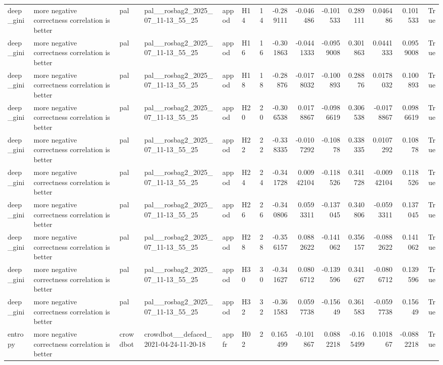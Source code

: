 \begin{longtable}{llllllrrrrrrrr}
deep\_gini & more negative correctness correlation is better & pal & pal\_\_rosbag2\_2025\_07\_11-13\_55\_25 & appod & H14 & 14 & -0.289111 & -0.046486 & -0.101533 & 0.289111 & 0.046486 & 0.101533 & True \\
deep\_gini & more negative correctness correlation is better & pal & pal\_\_rosbag2\_2025\_07\_11-13\_55\_25 & appod & H16 & 16 & -0.301863 & -0.0441333 & -0.0959008 & 0.301863 & 0.0441333 & 0.0959008 & True \\
deep\_gini & more negative correctness correlation is better & pal & pal\_\_rosbag2\_2025\_07\_11-13\_55\_25 & appod & H18 & 18 & -0.28876 & -0.0178032 & -0.100893 & 0.28876 & 0.0178032 & 0.100893 & True \\
deep\_gini & more negative correctness correlation is better & pal & pal\_\_rosbag2\_2025\_07\_11-13\_55\_25 & appod & H20 & 20 & -0.306538 & 0.0178867 & -0.0986619 & 0.306538 & -0.0178867 & 0.0986619 & True \\
deep\_gini & more negative correctness correlation is better & pal & pal\_\_rosbag2\_2025\_07\_11-13\_55\_25 & appod & H22 & 22 & -0.338335 & -0.0107292 & -0.10878 & 0.338335 & 0.0107292 & 0.10878 & True \\
deep\_gini & more negative correctness correlation is better & pal & pal\_\_rosbag2\_2025\_07\_11-13\_55\_25 & appod & H24 & 24 & -0.341728 & 0.00942104 & -0.118526 & 0.341728 & -0.00942104 & 0.118526 & True \\
deep\_gini & more negative correctness correlation is better & pal & pal\_\_rosbag2\_2025\_07\_11-13\_55\_25 & appod & H26 & 26 & -0.340806 & 0.0593311 & -0.137045 & 0.340806 & -0.0593311 & 0.137045 & True \\
deep\_gini & more negative correctness correlation is better & pal & pal\_\_rosbag2\_2025\_07\_11-13\_55\_25 & appod & H28 & 28 & -0.356157 & 0.0882622 & -0.141062 & 0.356157 & -0.0882622 & 0.141062 & True \\
deep\_gini & more negative correctness correlation is better & pal & pal\_\_rosbag2\_2025\_07\_11-13\_55\_25 & appod & H30 & 30 & -0.341627 & 0.0806712 & -0.139596 & 0.341627 & -0.0806712 & 0.139596 & True \\
deep\_gini & more negative correctness correlation is better & pal & pal\_\_rosbag2\_2025\_07\_11-13\_55\_25 & appod & H32 & 32 & -0.361583 & 0.0597738 & -0.15649 & 0.361583 & -0.0597738 & 0.15649 & True \\
entropy & more negative correctness correlation is better & crowdbot & crowdbot\_\_defaced\_2021-04-24-11-20-18 & appfr & H02 & 2 & 0.165499 & -0.101867 & 0.0882218 & -0.165499 & 0.101867 & -0.0882218 & True \\

\end{longtable}
